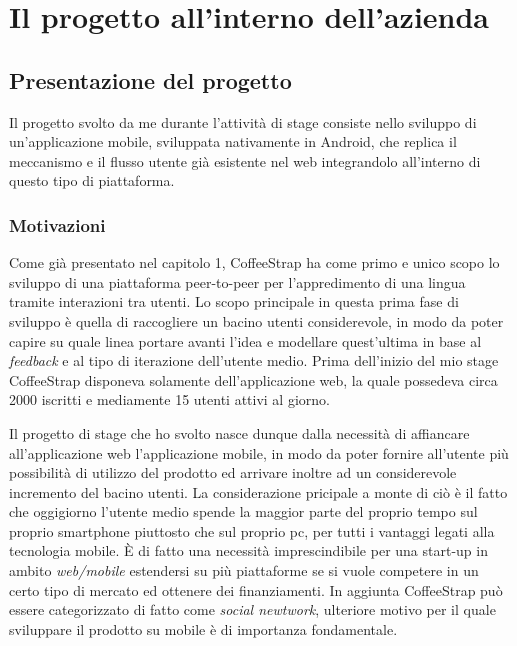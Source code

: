 
\chapter{Il progetto all'interno dell'azienda}
\label{cap:progetto-azienda}

\section{Presentazione del progetto}

Il progetto svolto da me durante l'attività di stage consiste nello sviluppo di un'applicazione mobile, sviluppata nativamente in Android, che replica il meccanismo e il flusso utente già esistente nel web integrandolo all'interno di questo tipo di piattaforma. 

\subsection{Motivazioni}

Come già presentato nel capitolo 1, CoffeeStrap ha come primo e unico scopo lo sviluppo di una piattaforma peer-to-peer per l'appredimento di una lingua tramite interazioni tra utenti. Lo scopo principale in questa prima fase di sviluppo è quella di raccogliere un bacino utenti considerevole, in modo da poter capire su quale linea portare avanti l'idea e modellare quest'ultima in base al \textit{feedback} e al tipo di iterazione dell'utente medio. Prima dell'inizio del mio stage CoffeeStrap disponeva solamente dell'applicazione web, la quale possedeva circa 2000 iscritti e mediamente 15 utenti attivi al giorno. 

Il progetto di stage che ho svolto nasce dunque dalla necessità di affiancare all'applicazione web l'applicazione mobile, in modo da poter fornire all'utente più possibilità di utilizzo del prodotto ed arrivare inoltre ad un considerevole incremento del bacino utenti. La considerazione pricipale a monte di ciò è il fatto che oggigiorno l'utente medio spende la maggior parte del proprio tempo sul proprio smartphone piuttosto che sul proprio pc, per tutti i vantaggi legati alla tecnologia mobile. È di fatto una necessità imprescindibile per una start-up in ambito \textit{web/mobile} estendersi su più piattaforme se si vuole competere in un certo tipo di mercato ed ottenere dei finanziamenti. In aggiunta CoffeeStrap può essere categorizzato di fatto come \textit{social newtwork}, ulteriore motivo per il quale sviluppare il prodotto su mobile è di importanza fondamentale.

